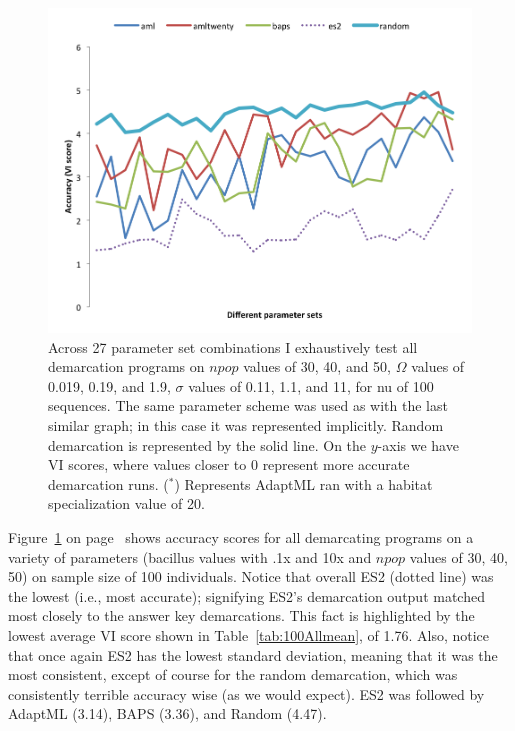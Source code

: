 \begin{figure}[h!]
  \centering
    \includegraphics[scale=0.75]{images/ResultGraphs/ResultGraphs-2}
      \caption[All demarcation graphical accuracy visualization on $nu = 100$.]{Across 27 parameter set combinations I exhaustively test all demarcation programs on $npop$ values of 30, 40, and 50, $\Omega$ values of 0.019, 0.19, and 1.9, $\sigma$ values of 0.11, 1.1, and 11, for nu of 100 sequences. The same parameter scheme was used as with the last similar graph; in this case it was represented implicitly. Random demarcation is represented by the solid line. On the $y$-axis we have VI scores, where values closer to 0 represent more accurate demarcation runs.  ($^\ast$) Represents AdaptML ran with a habitat specialization value of 20.}
    \label{fig:All100}
\end{figure}

Figure~\ref{fig:All100} on page~\pageref{fig:All100} shows accuracy scores for all demarcating programs on a variety of parameters (bacillus values with .1x and 10x and $npop$ values of 30, 40, 50) on sample size of 100 individuals.
Notice that overall ES2 (dotted line) was the lowest (i.e., most accurate); signifying ES2's demarcation output matched most closely to the answer key demarcations.
This fact is highlighted by the lowest average VI score shown in Table~\ref{tab:100Allmean}, of 1.76.
Also, notice that once again ES2 has the lowest standard deviation, meaning that it was the most consistent, except of course for the random demarcation, which was consistently terrible accuracy wise (as we would expect).
ES2 was followed by AdaptML (3.14), BAPS (3.36), and Random (4.47).

